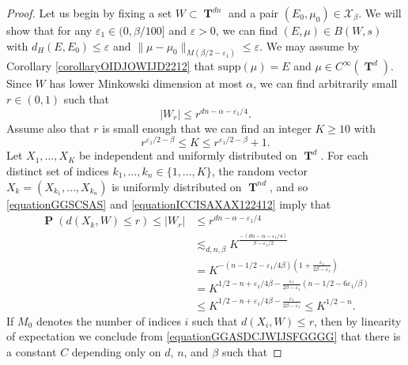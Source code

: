 \documentclass[12pt,reqno]{article}
\numberwithin{equation}{section}
\DeclareMathOperator{\TT}{\mathbf{T}}
\DeclareMathOperator{\PP}{\mathbf{P}}
\begin{document}
\begin{proof}
    Let us begin by fixing a set $W \subset \TT^{dn}$ and a pair $(E_0,\mu_0) \in \mathcal{X}_\beta$. We will show that for any $\varepsilon_1 \in (0,\beta/100]$ and $\varepsilon > 0$, we can find $(E,\mu) \in B(W,s)$ with $d_H(E,E_0) \leq \varepsilon$ and $\| \mu - \mu_0 \|_{M(\beta/2 - \varepsilon_1)} \leq \varepsilon$. We may assume by Corollary \ref{corollaryOIDJOWIJD2212} that $\text{supp}(\mu) = E$ and $\mu \in C^\infty(\TT^d)$. Since $W$ has lower Minkowski dimension at most $\alpha$, we can find arbitrarily small $r \in (0,1)$ such that
    \begin{equation} \label{equationGGSCSAS}
        |W_r| \leq r^{dn - \alpha - \varepsilon_1/4}.
    \end{equation}
    Assume also that $r$ is small enough that we can find an integer $K \geq 10$ with
    \begin{equation} \label{equationICCISAXAX122412}
        r^{\varepsilon_1/2 - \beta} \leq K \leq r^{\varepsilon_1/2 - \beta} + 1.
    \end{equation}
    Let $X_1, \dots, X_K$ be independent and uniformly distributed on $\TT^d$. For each distinct set of indices $k_1, \dots, k_n \in \{ 1, \dots, K \}$, the random vector $X_k = (X_{k_1}, \dots, X_{k_n})$ is uniformly distributed on $\TT^{nd}$, and so \eqref{equationGGSCSAS} and \eqref{equationICCISAXAX122412} imply that
    \begin{equation} \label{equationGGASDCJWIJSFGGGG}
    \begin{split}
        \PP(d(X_k,W) \leq r) \leq |W_{r}| &\leq r^{dn - \alpha - \varepsilon_1/4}\\
        &\lesssim_{d,n,\beta} K^{\frac{-(dn - \alpha - \varepsilon_1/4)}{\beta - \varepsilon_1/2}}\\
        &= K^{- \left( n - 1/2 - \varepsilon_1 / 4 \beta \right) \left( 1 + \frac{\varepsilon_1}{2\beta - \varepsilon_1} \right)}\\
        &= K^{1/2 - n + \varepsilon_1 / 4\beta - \frac{\varepsilon_1}{2\beta - \varepsilon_1}\left( n - 1/2 - 6\varepsilon_1/\beta \right)}\\
        &\leq K^{1/2 - n + \varepsilon_1/4\beta - \frac{\varepsilon_1}{2\beta - \varepsilon_1}} \leq K^{1/2 - n}.
    \end{split}
    \end{equation}
    If $M_0$ denotes the number of indices $i$ such that $d(X_i,W) \leq r$, then by linearity of expectation we conclude from \eqref{equationGGASDCJWIJSFGGGG} that there is a constant $C$ depending only on $d$, $n$, and $\beta$ such that

\end{proof}
\end{document}
